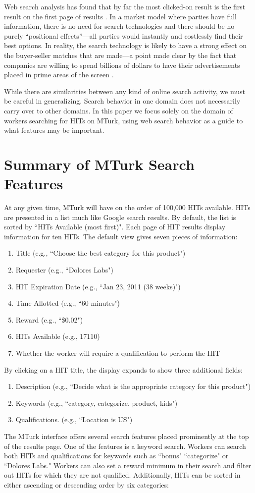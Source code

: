 \documentclass{acm_proc_article-sp}
\begin{document}
Web search analysis has found that by far the most clicked-on result
is the first result on the first page of results
\cite{spink2000selected}. In a market model where parties have full
information, there is no need for search technologies and there should
be no purely ``positional effects''---all parties would instantly and
costlessly find their best options. In reality, the search technology
is likely to have a strong effect on the buyer-seller matches that are
made---a point made clear by the fact that companies are willing to
spend billions of dollars to have their advertisements placed in prime
areas of the screen \cite{edelman2007internet}.

While there are similarities between any kind of online search
activity, we must be careful in generalizing.  Search behavior in one
domain does not necessarily carry over to other domains. In this paper
we focus solely on the domain of workers searching for HITs on MTurk,
using web search behavior as a guide to what features may be
important. 

\section{Summary of MTurk Search Features} \label{sec:features}
At any given time, MTurk will have on the order of 100,000 HITs
available.  HITs are presented in a list much like Google search
results.  By default, the list is sorted by ``HITs Available (most
first)".  Each page of HIT results display information for ten
HITs. The default view gives seven pieces of information:
\begin{enumerate}
\item Title (e.g., ``Choose the best category for this product")
\item Requester (e.g., ``Dolores Labs")
\item HIT Expiration Date (e.g., ``Jan 23, 2011  (38 weeks)")
\item Time Allotted (e.g., ``60 minutes")
\item Reward (e.g., ``\$0.02")
\item HITs Available (e.g., 17110)
\item Whether the worker will require a qualification to perform the HIT
\end{enumerate}
By clicking on a HIT title, the display expands to show three
additional fields:
\begin{enumerate}
\item Description (e.g., ``Decide what is the appropriate category for
  this product")
\item Keywords (e.g., ``category, categorize, product, kids")
\item Qualifications. (e.g., ``Location is US")
\end{enumerate}
The MTurk interface offers several search features placed prominently
at the top of the results page.  One of the features is a keyword
search.  Workers can search both HITs and qualifications for keywords
such as ``bonus" ``categorize" or ``Dolores Labs."  Workers can also
set a reward minimum in their search and filter out HITs for which
they are not qualified.  Additionally, HITs can be sorted in either
ascending or descending order by six categories:
\end{document}
